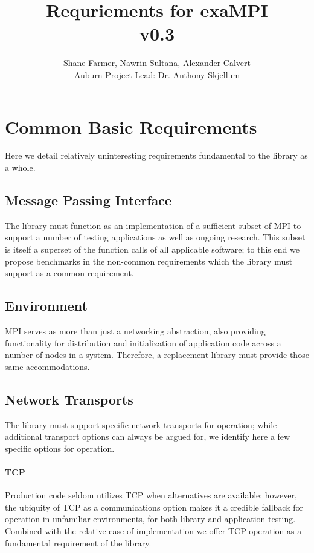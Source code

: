 \documentclass{article}
\title{Requriements for exaMPI\\ v0.3}
\author{Shane Farmer, Nawrin Sultana, Alexander Calvert\\Auburn Project Lead:  Dr. Anthony Skjellum}
\begin{document}
\maketitle
\tableofcontents


\section{Common Basic Requirements}

Here we detail relatively uninteresting requirements fundamental to the library as a whole.

\subsection{Message Passing Interface}

The library must function as an implementation of a sufficient subset of MPI to support a number of testing applications as well as ongoing research.  This subset is itself a superset of the function calls of all applicable software; to this end we propose benchmarks in the non-common requirements which the library must support as a common requirement.

\subsection{Environment}

MPI serves as more than just a networking abstraction, also providing functionality for distribution and initialization of application code across a number of nodes in a system.  Therefore, a replacement library must provide those same accommodations.

\subsection{Network Transports}

The library must support specific network transports for operation; while additional transport options can always be argued for, we identify here a few specific options for operation.

\paragraph{TCP}  Production code seldom utilizes TCP when alternatives are available; however, the ubiquity of TCP as a communications option makes it a credible fallback for operation in unfamiliar environments, for both library and application testing.  Combined with the relative ease of implementation we offer TCP operation as a fundamental requirement of the library.
\end{document}
